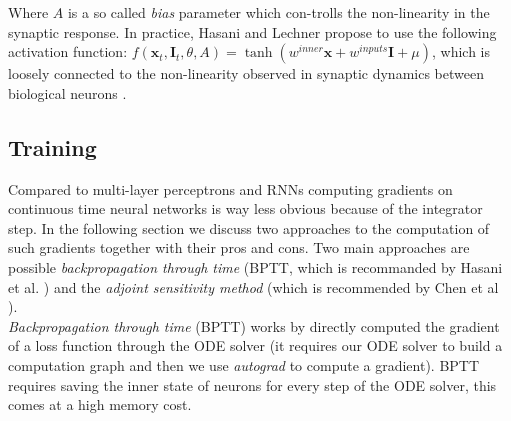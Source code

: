 Where $A$ is a so called \textit{bias} parameter which con-trolls the non-linearity in the synaptic response. In practice, Hasani and Lechner propose to use the following activation function: $f(\bm{x}_t, \bm{I}_t, \theta, A) = \tanh (w^\textit{inner} \bm{x} + w^\textit{inputs} \bm{I} + \mu)$, which is loosely connected to the non-linearity observed in synaptic dynamics between biological neurons \cite{Lechner2020NeuralCP}.

\begin{table}[h!]
\centering
\caption{Time-Continuous Neural Network Classes}
\end{table}


\subsection{Training}

Compared to multi-layer perceptrons and RNNs computing gradients on continuous time neural networks is way less obvious because of the integrator step. In the following section we discuss two approaches to the computation of such gradients together with their pros and cons. Two main approaches are possible \textit{backpropagation through time} (BPTT, which is recommanded by Hasani et al. \cite{Hasani2021LiquidTN}) and the \textit{adjoint sensitivity method} (which is recommended by Chen et al \cite{Chen2018NeuralOD}). \\

\textit{Backpropagation through time} (BPTT) \cite{Hasani2021LiquidTN} works by directly computed the gradient of a loss function through the ODE solver (it requires our ODE solver to build a computation graph and then we use \textit{autograd} to compute a gradient). BPTT requires saving the inner state of neurons for every step of the ODE solver, this comes at a high memory cost. \\


